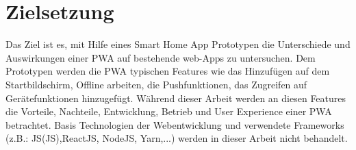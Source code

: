 \newpage
\section{Zielsetzung}\label{sub:Zielsetzung}
Das Ziel  ist es, mit Hilfe eines Smart Home App Prototypen die Unterschiede und Auswirkungen einer \acs{PWA} auf bestehende \acs{web-App}s zu untersuchen.  
Dem Prototypen werden die \acs{PWA} typischen Features wie das Hinzufügen auf dem Startbildschirm, Offline arbeiten, die Pushfunktionen, 
das Zugreifen auf Gerätefunktionen hinzugefügt. 
Während dieser Arbeit werden an diesen Features die Vorteile, Nachteile, Entwicklung, Betrieb und User Experience einer \acl{PWA} betrachtet.
Basis Technologien der Webentwicklung und verwendete Frameworks (z.B.: \acl{JS}(\acs{JS}),ReactJS, NodeJS, Yarn,...) werden in dieser Arbeit nicht behandelt.
